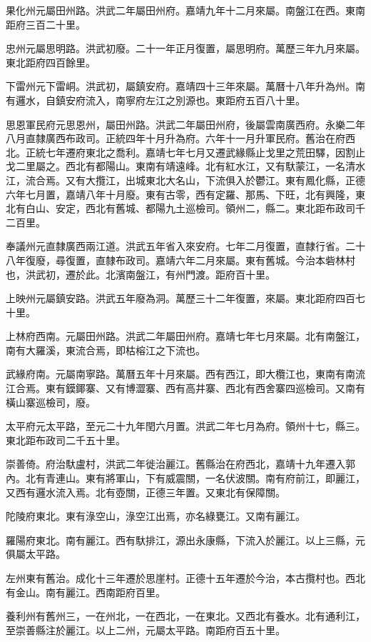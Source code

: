 果化州元屬田州路。洪武二年屬田州府。嘉靖九年十二月來屬。南盤江在西。東南距府三百二十里。

忠州元屬思明路。洪武初廢。二十一年正月復置，屬思明府。萬歷三年九月來屬。東北距府四百餘里。

下雷州元下雷峒。洪武初，屬鎮安府。嘉靖四十三年來屬。萬曆十八年升為州。南有邏水，自鎮安府流入，南寧府左江之別源也。東距府五百八十里。

思恩軍民府元思恩州，屬田州路。洪武二年屬田州府，後屬雲南廣西府。永樂二年八月直隸廣西布政司。正統四年十月升為府。六年十一月升軍民府。舊治在府西北。正統七年遷府東北之喬利。嘉靖七年七月又遷武緣縣止戈里之荒田驛，因割止戈二里屬之。西北有都陽山。東南有靖遠峰。北有紅水江，又有馱蒙江，一名清水江，流合焉。又有大攬江，出城東北大名山，下流俱入於鬱江。東有鳳化縣，正德六年七月置，嘉靖八年十月廢。東有古零，西有定羅、那馬、下旺，北有興隆，東北有白山、安定，西北有舊城、都陽九土巡檢司。領州二，縣二。東北距布政司千二百里。

奉議州元直隸廣西兩江道。洪武五年省入來安府。七年二月復置，直隸行省。二十八年復廢，尋復置，直隸布政司。嘉靖六年二月來屬。東有舊城。今治本砦林村也，洪武初，遷於此。北濱南盤江，有州門渡。距府百十里。

上映州元屬鎮安路。洪武五年廢為洞。萬歷三十二年復置，來屬。東北距府四百七十里。

上林府西南。元屬田州路。洪武二年屬田州府。嘉靖七年七月來屬。北有南盤江，南有大羅溪，東流合焉，即枯榕江之下流也。

武緣府南。元屬南寧路。萬曆五年十月來屬。西有西江，即大欖江也，東南有南流江合焉。東有鏌鎁寨、又有博澀寨、西有高井寨、西北有西舍寨四巡檢司。又南有橫山寨巡檢司，廢。

太平府元太平路，至元二十九年閏六月置。洪武二年七月為府。領州十七，縣三。東北距布政司二千五十里。

崇善倚。府治馱盧村，洪武二年徙治麗江。舊縣治在府西北，嘉靖十九年遷入郭內。北有青連山。東有將軍山，下有威震關，一名伏波關。南有府前江，即麗江，又西有邏水流入焉。北有壺關，正德三年置。又東北有保障關。

陀陵府東北。東有淥空山，淥空江出焉，亦名綠甕江。又南有麗江。

羅陽府東北。南有麗江。西有馱排江，源出永康縣，下流入於麗江。以上三縣，元俱屬太平路。

左州東有舊治。成化十三年遷於思崖村。正德十五年遷於今治，本古攬村也。西北有金山。南有麗江。西南距府百里。

養利州有舊州三，一在州北，一在西北，一在東北。又西北有養水。北有通利江，至崇善縣注於麗江。以上二州，元屬太平路。南距府百五十里。

